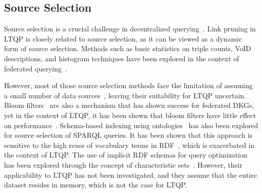 \subsection{Source Selection}
Source selection is a crucial challenge in decentralized querying~\cite{hose2012towards, Harth2010}.
Link pruning in \ac{LTQP} is closely related to source selection, as it can be viewed as a dynamic form of source selection.
Methods such as basic statistics on triple counts, \ac{VoID} descriptions, and histogram techniques have been explored in the context of federated querying~\cite{hose2012towards, Harth2010, Montoya2017}.

\begin{figure}
   \centering
   
   \caption{}
   \label{fig:void}
\end{figure}
However, most of those source selection methods face the limitation of assuming a small number of data sources~\cite{Harth2010}, leaving their suitability for \ac{LTQP} uncertain.
Bloom filters~\cite{dia2018fast} are also a mechanism that has shown success for federated \acp{DKG}, yet in the context of \ac{LTQP}, it has been shown that bloom filters have little effect on performance~\cite{Hanski2024}.
Schema-based indexing using ontologies~\cite{Stuckenschmidt2004} has also been explored for source selection of SPARQL queries.
It has been shown that this approach is sensitive to the high reuse of vocabulary terms in \ac{RDF}~\cite{Harth2010}, which is exacerbated in the context of \ac{LTQP}.
The use of implicit \ac{RDF} schemas for query optimization has been explored through the concept of characteristic sets~\cite{Neumann2011CharacteristicSA, Meimaris2017ExtendedCS, Montoya2017}.
However, their applicability to \ac{LTQP} has not been investigated, and they assume that the entire dataset resides in memory, which is not the case for \ac{LTQP}.
